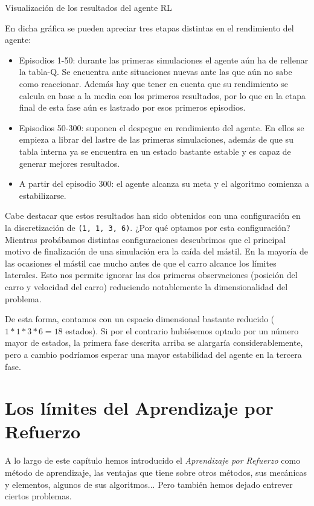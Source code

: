 %
       {Visualización de los resultados del agente RL}

En dicha gráfica se pueden apreciar tres etapas distintas en el rendimiento del agente:
\begin{itemize}
    \item Episodios 1-50: durante las primeras simulaciones el agente aún ha de rellenar la tabla-Q. Se encuentra ante situaciones nuevas ante las que aún no sabe como reaccionar. Además hay que tener en cuenta que su rendimiento se calcula en base a la media con los primeros resultados, por lo que en la etapa final de esta fase aún es lastrado por esos primeros episodios.
    \item Episodios 50-300: suponen el despegue en rendimiento del agente. En ellos se empieza a librar del lastre de las primeras simulaciones, además de que su tabla interna ya se encuentra en un estado bastante estable y es capaz de generar mejores resultados.
    \item A partir del episodio 300: el agente alcanza su meta y el algoritmo comienza a estabilizarse.
\end{itemize}

Cabe destacar que estos resultados han sido obtenidos con una configuración en la discretización de \texttt{(1, 1, 3, 6)}. ¿Por qué optamos por esta configuración? Mientras probábamos distintas configuraciones descubrimos que el principal motivo de finalización de una simulación era la caída del mástil. En la mayoría de las ocasiones el mástil cae mucho antes de que el carro alcance los límites laterales. Esto nos permite ignorar las dos primeras observaciones (posición del carro y velocidad del carro) reduciendo notablemente la dimensionalidad del problema.

De esta forma, contamos con un espacio dimensional bastante reducido ($1*1*3*6=18$ estados). Si por el contrario hubiésemos optado por un número mayor de estados, la primera fase descrita arriba se alargaría considerablemente, pero a cambio podríamos esperar una mayor estabilidad del agente en la tercera fase.

\section{Los límites del Aprendizaje por Refuerzo}
A lo largo de este capítulo hemos introducido el \textit{Aprendizaje por Refuerzo} como método de aprendizaje, las ventajas que tiene sobre otros métodos, sus mecánicas y elementos, algunos de sus algoritmos... Pero también hemos dejado entrever ciertos problemas.

